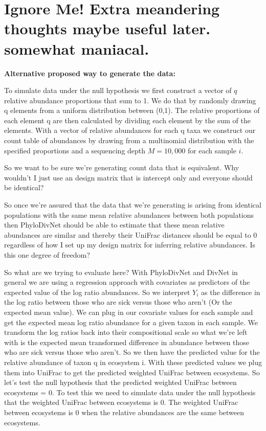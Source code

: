 \documentclass{article}
\begin{document}
\section{Ignore Me! Extra meandering thoughts maybe useful later. somewhat maniacal.}

\textbf{Alternative proposed way to generate the data:}

To simulate data under the null hypothesis we first construct a vector of $q$ relative abundance proportions that sum to 1. We do that by randomly drawing q elements from a uniform distribution between (0,1). The relative proportions of each element q are then calculated by dividing each element by the sum of the elements. With a vector of relative abundances for each q taxa we construct our count table of abundances by drawing from a multinomial distribution with the specified proportions and a sequencing depth $M = 10,000$ for each sample $i$.

So we want to be sure we're generating count data that is equivalent. Why wouldn't I just use an design matrix that is intercept only and everyone should be identical?

So once we're assured that the data that we're generating is arising from identical populations with the same mean relative abundances between both populations then PhyloDivNet should be able to estimate that these mean relative abundances are similar and thereby their UniFrac distances should be equal to 0 regardless of how I set up my design matrix for inferring relative abundances. Is this one degree of freedom?

So what are we trying to evaluate here? With PhyloDivNet and DivNet in general we are using a regression approach with covariates as predictors of the expected value of the log ratio abundances. So we interpret $Y_i$ as the difference in the log ratio between those who are sick versus those who aren't (Or the expected mean value). We can plug in our covariate values for each sample and get the expected mean log ratio abundance for a given taxon in each sample. We transform the log ratios back into their compositional scale so what we're left with is the expected mean transformed difference in abundance between those who are sick versus those who aren't. So we then have the predicted value for the relative abundance of taxon q in ecosystem i. With these predicted values we plug them into UniFrac to get the predicted weighted UniFrac between ecosystems. So let's test the null hypothesis that the predicted weighted UniFrac between ecosystems = 0. To test this we need to simulate data under the null hypothesis that the weighted UniFrac between ecosystems is 0. The weighted UniFrac between ecosystems is 0 when the relative abundances are the same between ecosystems.
\end{document}
